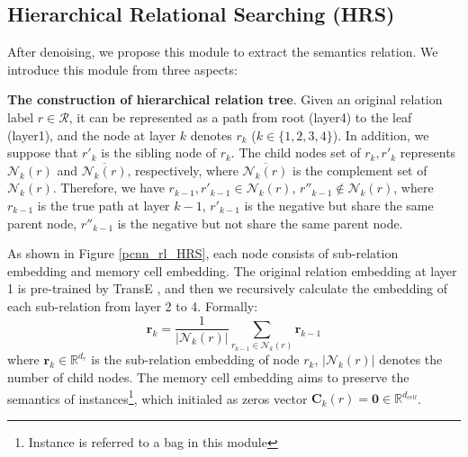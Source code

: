 \documentclass{article}
\begin{document}
\subsection{Hierarchical Relational Searching (HRS)}

After denoising, we propose this module to extract the semantics relation. We introduce this module from three aspects:

\textbf{The construction of hierarchical relation tree}. Given an original relation label $r\in\mathcal{R}$, it can be represented as a path from root (layer4) to the leaf (layer1), and the node at layer $k$ denotes $r_k$ ($k\in\{1,2,3,4\}$). In addition, we suppose that $r'_k$ is the sibling node of $r_k$. The child nodes set of $r_k, r'_k$ represents $\mathcal{N}_k(r)$ and $\overline{\mathcal{N}_k(r)}$, respectively, where $\overline{\mathcal{N}_k(r)}$ is the complement set of $\mathcal{N}_k(r)$. Therefore, we have $r_{k-1}, r'_{k-1}\in\mathcal{N}_k(r)$, $r''_{k-1}\notin\mathcal{N}_k(r)$, where $r_{k-1}$ is the true path at layer $k-1$, $r'_{k-1}$ is the negative but share the same parent node, $r''_{k-1}$ is the negative but not share the same parent node.

As shown in Figure \ref{pcnn_rl_HRS}, each node consists of sub-relation embedding and memory cell embedding. The original relation embedding at layer 1 is pre-trained by TransE \cite{Fan2014Transition}, and then we recursively calculate the embedding of each sub-relation from layer 2 to 4. Formally:
\begin{equation}
\mathbf{r}_k = \frac{1}{|\mathcal{N}_k(r)|}\sum_{r_{k-1}\in\mathcal{N}_k(r)}\mathbf{r}_{k-1}
\label{eq6}
\end{equation}
where $\mathbf{r}_k\in\mathbb{R}^{d_r}$ is the sub-relation embedding of node $r_k$, $|\mathcal{N}_k(r)|$ denotes the number of child nodes. The memory cell embedding aims to preserve the semantics of instances\footnote{Instance is referred to a bag in this module}, which initialed as zeros vector $\mathbf{C}_k{(r)}=\mathbf{0}\in\mathbb{R}^{d_{cell}}$.
\end{document}
